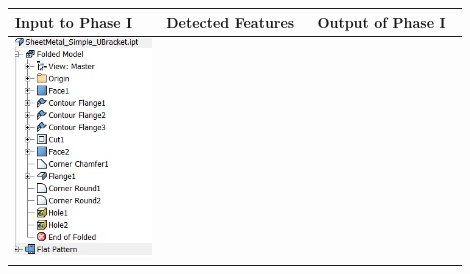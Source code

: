 \begin{minipage}[t]{\linewidth}
\begin{tabular}[!h]{@{} p{0.3\linewidth} | p{0.3\linewidth} | p{0.3\linewidth}@{}} \toprule

\textbf{Input to Phase I} & \textbf{Detected Features} & \textbf{Output of Phase I} \\ \midrule

\includegraphics[width=0.92\linewidth]{..//Common/images/DefeatPhase_I_t1} &

\end{tabular}
\end{minipage}
